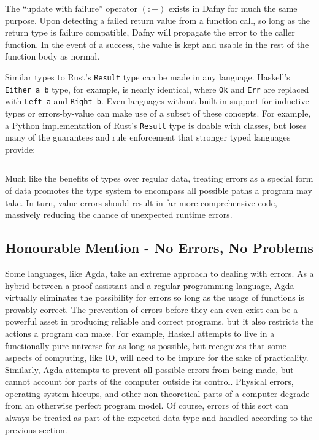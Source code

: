 \documentclass{article}
\begin{document}
The ``update with failure'' operator $(\colon -)$ exists in Dafny for much the same purpose. Upon detecting a failed return value from
a function call, so long as the return type is failure compatible, Dafny will propagate the error to the caller function.
In the event of a success, the value is kept and usable in the rest of the function body as normal.

Similar types to Rust's \texttt{Result} type can be made in any language.
Haskell's \texttt{Either a b} type, for example, is nearly identical, where \texttt{Ok} and \texttt{Err}
are replaced with \texttt{Left a} and \texttt{Right b}.
Even languages without built-in support for inductive types or
errors-by-value can make use of a subset of these concepts. For example,
a Python implementation of Rust's \texttt{Result} type is doable with classes, but loses many of the guarantees
and rule enforcement that stronger typed languages provide:
\inputminted{python}{linked_list/python_result.py}

Much like the benefits of types over regular data, treating errors as a special form of data
promotes the type system to encompass all possible paths a program may take. In turn,
value-errors should result in far more comprehensive code, massively reducing the chance of unexpected runtime errors.

\subsection{Honourable Mention - No Errors, No Problems}

Some languages, like Agda, take an extreme approach to dealing with errors. As a hybrid between a proof assistant
and a regular programming language, Agda virtually eliminates the possibility for errors so long as the usage of
functions is provably correct. The prevention of errors before they can even exist can be a powerful asset
in producing reliable and correct programs, but it also restricts the actions a program can make. For example,
Haskell attempts to live in a functionally pure universe for as long as possible, but recognizes that some
aspects of computing, like IO, will need to be impure for the sake of practicality. Similarly, Agda attempts
to prevent all possible errors from being made, but cannot account for parts of the computer outside its control.
Physical errors, operating system hiccups, and other non-theoretical parts of a computer degrade from an otherwise
perfect program model. Of course, errors of this sort can always be treated as part of the expected data type and
handled according to the previous section.
\end{document}

